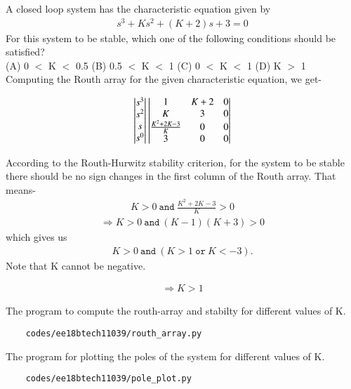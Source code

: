 \begin{enumerate}[label=\thesubsection.\arabic*.,ref=\thesubsection.\theenumi]

A closed loop system has the characteristic equation given by \begin{align} s^3+Ks^2+(K+2)s+3 = 0 \end{align}For this system to be stable, which one of the following conditions should be satisfied? \\
(A) 0 \(<\) K \(<\) 0.5 
(B) 0.5 \(<\) K \(<\) 1 
(C) 0 \(<\) K \(<\) 1 
(D) K \(>\) 1 \\

\solution
Computing the Routh array for the given characteristic equation, we get-

\begin{align}
    \begin{vmatrix}s^3 \\ s^2 \\ s \\ s^0\end{vmatrix} 
    \begin{vmatrix}1 & K+2 & 0 \\ K & 3 & 0 \\ \frac{K^2+2K-3}{K} & 0 & 0 \\ 3 & 0 & 0\end{vmatrix}
\end{align}

According to the Routh-Hurwitz stability criterion, for the system to be stable there should be no sign changes in the first column of the Routh array. That means-
\begin{align}
    K > 0 \ \texttt{and} \ \frac{K^2+2K-3}{K} > 0 
\end{align}
\begin{align}
\Rightarrow K > 0 \ \texttt{and} \ (K-1)(K+3) > 0 
\end{align}
which gives us 
\begin{align}
    K > 0 \ \texttt{and} \ (K > 1 \ \texttt{or} \ K < -3).
\end{align}
Note that K cannot be negative.

\begin{align}
\Rightarrow K > 1 
\end{align}

The program to compute the routh-array and stabilty for different values of K.
\begin{lstlisting}
    codes/ee18btech11039/routh_array.py
\end{lstlisting}

The program for plotting the poles of the system for different values of K.
\begin{lstlisting}
    codes/ee18btech11039/pole_plot.py
\end{lstlisting}


\end{enumerate}
